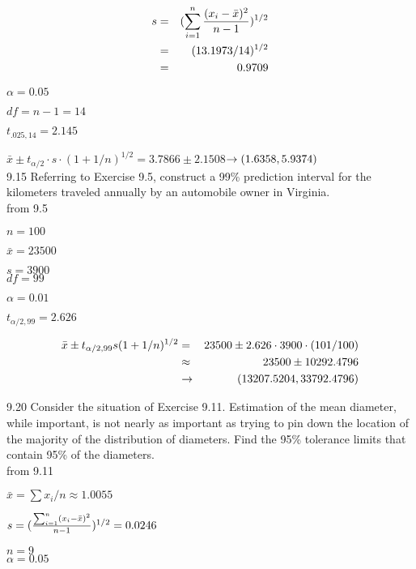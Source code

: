 \begin{eqnarray*}
s & = & (\sum^n_{i = 1} \frac{(x_i - \bar{x})^2}{n-1})^{1/2} \\
& = & (13.1973/14)^{1/2} \\
& = & 0.9709
\end{eqnarray*}

$\alpha = 0.05$

$df = n - 1 = 14$

$t_{.025,14} = 2.145$

$\bar{x} \pm t_{\alpha/2} \cdot s \cdot (1 + 1/n)^{1/2} $$= 3.7866 \pm 2.1508 $$\rightarrow (1.6358, 5.9374)$ \\

9.15 Referring to Exercise 9.5, construct a 99\% prediction interval for the kilometers traveled annually by an automobile owner in Virginia. \\

from 9.5 

$n = 100$ 

$\bar{x} = 23500$

$s = 3900$ \\

$df = 99$ 

$\alpha = 0.01$

$t_{\alpha/2, 99} = 2.626$

\begin{eqnarray*}
\bar{x} \pm t_{\alpha/2,99} s (1 + 1/n)^{1/2} 
& = & 23500 \pm 2.626 \cdot 3900 \cdot (101/100) \\
& \approx & 23500 \pm 10292.4796 \\
& \rightarrow & (13207.5204, 33792.4796) 
\end{eqnarray*}

9.20  Consider the situation of Exercise 9.11. Estimation of the mean diameter, while important, is not nearly as important as trying to pin down the location of the majority of the distribution of diameters. Find the 95\% tolerance limits that contain 95\% of the diameters. \\

from 9.11

$\bar{x} = \sum x_i /n \approx 1.0055 $ 


$s = (\frac{\sum_{i=1}^n(x_i - \bar{x})^2}{n-1})^{1/2} = 0.0246$ 

$n = 9$  \\


$\alpha = 0.05 $

